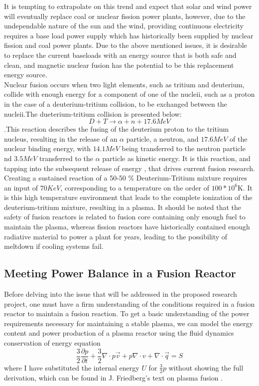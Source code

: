 \documentclass{article}
\begin{document}
It is tempting to extrapolate on this trend and expect that solar and wind power will eventually replace coal or nuclear fission power plants, however, due to the undependable nature of the sun and the wind, providing continuous electricity requires a base load power supply which has historically been supplied by nuclear fission and coal power plants. Due to the above mentioned issues, it is desirable to replace the current baseloads with an energy source that is both safe and clean, and  magnetic nuclear fusion has the potential to be this replacement energy source.\\
Nuclear fusion occurs when two light elements, such as tritium and deuterium, collide with enough energy for a component of one of the nucleii, such as a proton in the case of a deuterium-tritium collision, to be exchanged  between the nucleii.The dueterium-tritium collision is presented below:
$$
D+T \rightarrow \alpha + n + 17.6 MeV
$$  
\cite{J_Friedberg:1} .This reaction describes the fusing of the deuterium proton to the tritium nucleus, resulting in the release of an $\alpha$ particle, a neutron, and $17.6 MeV$ of the nuclear binding energy, with $14.1 MeV$ being transferred to the neutron particle nd $3.5 MeV$ transferred to the $\alpha$ particle as kinetic energy. It is this reaction, and tapping into the subsequent release of energy , that drives current fusion research. Creating a sustained reaction of a 50-50 $\%$ Deuterium-Tritium mixture requires an input of $70KeV$, corresponding to a temperature on the order of $100*10^6$K. It is this high temperature environment that leads to the complete ionization of the deuterium-tritium mixture, resulting in a plasma. It should be noted that the safety of fusion reactors is related to fusion core containing only enough fuel to maintain the plasma, whereas fission reactors have historically contained enough radiative material to power a plant for years, leading to the possibility of meltdown if cooling systems fail.
\subsection{Meeting Power Balance in a Fusion Reactor}
Before delving into the issue that will be addressed in the proposed research project, one must have a firm understanding of the conditions required in a fusion reactor to maintain a fusion reaction.	To get a basic understanding of the power requirements necessary for maintaining a stable plasma, we can model the energy content and power production of a plasma reactor using the fluid dynamics conservation of energy equation
$$
\frac{3}{2}\frac{\partial p}{\partial t} + \frac{3}{2}\nabla \cdot p \vec{v} + p\nabla \cdot v + \nabla\cdot \vec{q} = S
$$
where I have substituted the internal energy $U$ for $\frac{3}{2}p$ without showing the full derivation, which can be found in J. Friedberg's text on plasma fusion \cite{J_Friedberg:1}. \\
\end{document}
